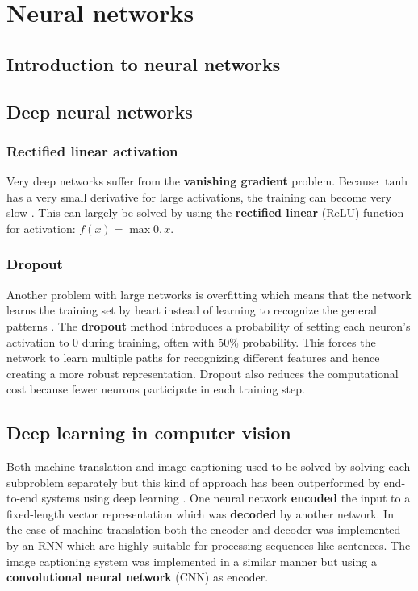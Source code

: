 

\section{Neural networks}

\subsection{Introduction to neural networks}

\subsection{Deep neural networks}

\subsubsection{Rectified linear activation}

Very deep networks suffer from the \textbf{vanishing gradient} problem. Because $\tanh$ has a very small derivative for large activations, the training can become very slow \cite{AlexNet}. This can largely be solved by using the \textbf{rectified linear} (ReLU) function for activation: $f(x) = \max{0, x}$.

\subsubsection{Dropout}

Another problem with large networks is overfitting which means that the network learns the training set by heart instead of learning to recognize the general patterns \cite{AlexNet, FornesCnnCategorization}. The \textbf{dropout} method introduces a probability of setting each neuron's activation to $0$ during training, often with 50\% probability. This forces the network to learn multiple paths for recognizing different features and hence creating a more robust representation. Dropout also reduces the computational cost because fewer neurons participate in each training step.


\subsection{Deep learning in computer vision}

Both machine translation and image captioning used to be solved by solving each subproblem separately but this kind of approach has been outperformed by end-to-end systems using deep learning \cite{ShowAndTell}. One neural network \textbf{encoded} the input to a fixed-length vector representation which was \textbf{decoded} by another network. In the case of machine translation both the encoder and decoder was implemented by an RNN which are highly suitable for processing sequences like sentences. The image captioning system was implemented in a similar manner but using a \textbf{convolutional neural network} (CNN) as encoder.


